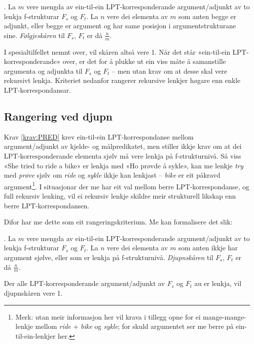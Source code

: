 \documentclass[12pt,a4paper,oneside,draft]{report}
\begin{document}
\ex. \label{krav:arg-order-rate} La $m$ vere mengda av ein-til-ein
     LPT\hyp{}korresponderande argument/adjunkt av to lenkja f\hyp{}strukturar
     $F_s$ og $F_t$. La $n$ vere dei elementa av $m$ som anten begge
     er adjunkt, eller begge er argument og har same posisjon i
     argumentstrukturane sine. \emph{Følgjeskåren} til $F_s$, $F_t$ er då
     $\frac{n}{m}$.

I spesialtilfellet nemnt over, vil skåren altså vere 1. Når det står
«ein-til-ein LPT\hyp{}korresponderande» over, er det for å plukke ut ein
viss måte å samanstille argumenta og adjunkta til $F_s$ og $F_t$ --
men utan krav om at desse skal vere rekursivt lenkja. Kriteriet
nedanfor rangerer rekursive lenkjer høgare enn enkle
LPT\hyp{}korrespondansar.

\subsection{Rangering ved djupn}
\label{sec-3.8.2}

Krav \ref{krav:PRED} krev ein-til-ein LPT\hyp{}korrespondanse mellom
argument/adjunkt av kjelde- og målpredikatet, men stiller ikkje krav
om at dei LPT\hyp{}korresponderande elementa sjølv må vere lenkja på
f\hyp{}strukturnivå. Så viss «She tried to ride a bike» er lenkja med «Ho
prøvde å sykle», kan me lenkje \emph{try} med \emph{prøve} sjølv om \emph{ride} og
\emph{sykle} ikkje kan lenkjast -- \emph{bike} er eit påkravd argument\footnote{Merk: utan meir informasjon her vil krava i tillegg opne for
        ei mange-mange-lenkje mellom \emph{ride} + \emph{bike} og \emph{sykle}; for
        skuld argumentet ser me berre på ein-til-ein-lenkjer her. }. I
situasjonar der me har eit val mellom berre LPT\hyp{}korrespondanse, og
full rekursiv lenking, vil ei rekursiv lenkje skildre meir
strukturell likskap enn berre LPT\hyp{}korrespondansen.

Difor har me dette som eit rangeringskriterium. Me kan formalisere det
slik:

\ex. \label{krav:sub-f-rate} La $m$ vere mengda av ein-til-ein
     LPT\hyp{}korresponderande argument/adjunkt av to lenkja f\hyp{}strukturar
     $F_s$ og $F_t$. La $n$ vere dei elementa av $m$ som anten ikkje
     har argument sjølve, eller som er lenkja på
     f\hyp{}strukturnivå. \emph{Djupnskåren} til $F_s$, $F_t$ er då
     $\frac{n}{m}$.

Der alle LPT\hyp{}korresponderande argument/adjunkt av $F_s$ og $F_t$ au er
lenkja, vil djupnskåren vere 1.
\end{document}
